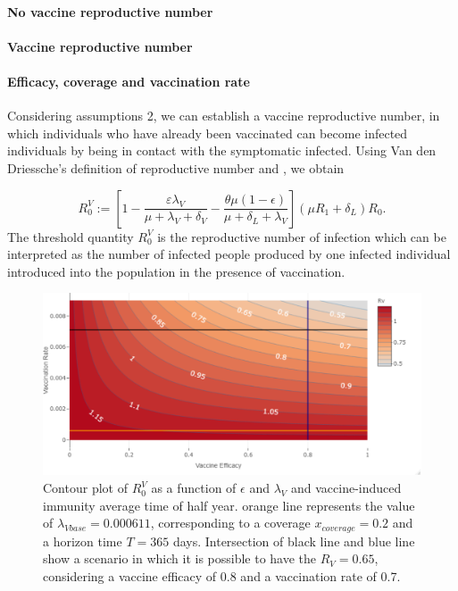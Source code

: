 \paragraph{No  vaccine reproductive number}
\paragraph{Vaccine reproductive number}
\paragraph{Efficacy, coverage and vaccination rate}

%
%
Considering assumptions 2, we can establish a vaccine reproductive number,
in which individuals who have already been vaccinated
can become infected individuals by being in contact with the
symptomatic infected. Using Van den Driessche’s \cite{VandenDriessche2017a}
definition of reproductive number and \cite{Alexander2004}, we obtain

\begin{equation*}
 R_{0}^V := \left[ 1-\frac{\varepsilon \lambda_V}
 {\mu+\lambda_V+\delta_V}
 -\frac{\theta\mu(1-\epsilon)}{\mu+\delta_L+\lambda_V}\right]
 (\mu R_1+\delta_L)R_0.
\end{equation*}
%
The threshold quantity $R_0^V$ is the reproductive number of infection
which can be interpreted as the number of infected people produced
by one infected individual introduced into the population in the
presence of vaccination.

\begin{figure}[tbh]
    \centering
      \includegraphics[scale=0.6, keepaspectratio]{Figures/Rv_contour}
    \caption{
    Contour plot  of $R_0^V$ as a function of $ \epsilon $ and $ \lambda_V $ and  
        vaccine-induced
        immunity average time of half year. orange line represents the 
        value of $\lambda_{Vbase}=\num{0.000611}$, corresponding to a coverage 
        $x_{coverage} = \num{0.2}$ and a horizon time $T=\num{365}$ days.
        Intersection of black line and blue line show a scenario in which it is
        possible to have the $R_V=0.65$, considering a vaccine efficacy of 
        \num{0.8} and a vaccination rate 
        of \num{0.7}.}
    \label{fig:rvcontour1}
\end{figure}

